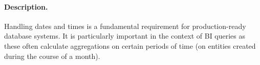 
\paragraph{Description.}

Handling dates and times is a fundamental requirement for production-ready
database systems. It is particularly important in the context of BI queries as
these often calculate aggregations on certain periods of time (\eg on entities
created during the course of a month).


